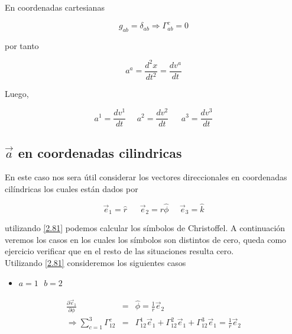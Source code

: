 \documentclass[12pt]{report}
\begin{document}
En coordenadas cartesianas

\begin{equation} \nonumber
g_{ab}=\delta_{ab} \Rightarrow \Gamma_{ab}^c = 0
\end{equation}

por tanto 

\begin{equation} \nonumber
a^a = \frac{d^2 x}{dt^2}= \frac{dv^a}{dt}
\end{equation}

Luego,

\begin{equation} \nonumber
a^1 = \frac{dv^1}{dt} \ \ \ \ \  \ a^2 = \frac{dv^2}{dt} \ \ \ \ \ \ \ a^3 = \frac{dv^3}{dt}
\end{equation}


\subsection{$\vec{a}$ en coordenadas cilindricas}

En este caso nos sera útil considerar los vectores direccionales en coordenadas cilíndricas los cuales  están dados por

\begin{equation} \nonumber
\vec{e}_1= \hat{r} \ \ \  \ \ \ \ \vec{e}_2 = r\hat{\phi} \ \ \ \ \ \ \vec{e}_3= \hat{k}
\end{equation}

utilizando \eqref{2.81} podemos calcular los símbolos de Christoffel. A continuación veremos los casos en los cuales los símbolos son distintos de cero, queda como ejercicio verificar que en el resto de las situaciones resulta cero. \\

Utilizando \eqref{2.81} consideremos los siguientes casos \\

\begin{itemize}
\item $a=1 \ \ \ b=2 \ \ \ $
\end{itemize}

\begin{eqnarray} \nonumber
\frac{\partial \vec{e}_1}{\partial \phi} &=&  \hat{\phi}=\frac{1}{r}\vec{e}_2 \\ \nonumber
\Rightarrow  \sum_{c=1}^3 \Gamma_{12}^c &=& \Gamma_{12}^1\vec{e}_1 + \Gamma_{12}^2\vec{e}_1 + \Gamma_{12}^3\vec{e}_1 = \frac{1}{r} \vec{e}_2
\end{eqnarray}
\end{document}
